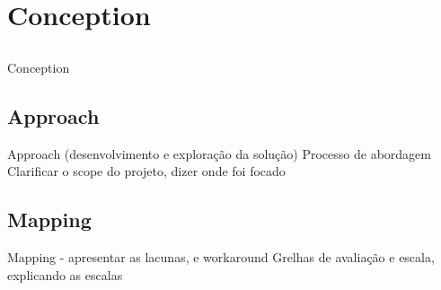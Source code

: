 \chapter{Conception} \label{chap:conception}

\section*{}

Conception

\section{Approach} \label{sec:Approach}
	Approach (desenvolvimento e exploração da solução)
	Processo de abordagem
	Clarificar o scope do projeto, dizer onde foi focado


\section{Mapping} \label{sec:maping}
	Mapping - apresentar as lacunas, e workaround
		Grelhas de avaliação e escala, explicando as escalas
